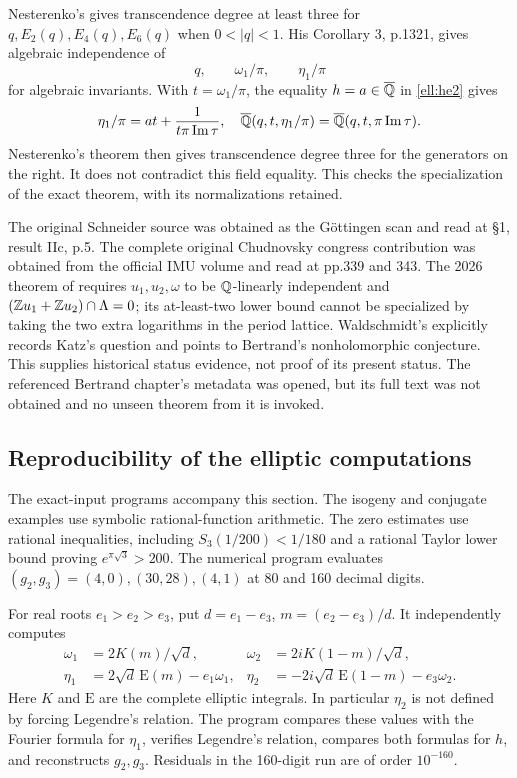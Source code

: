 Nesterenko's \cite[Theorem 1, p.1320]{EllNesterenko1996} gives transcendence degree at least three for $q,E_2(q),E_4(q),E_6(q)$ when $0<|q|<1$. His Corollary 3, p.1321, gives algebraic independence of
\[
 q,\qquad \omega_1/\pi,\qquad \eta_1/\pi
\]
for algebraic invariants. With $t=\omega_1/\pi$, the equality $h=a\in\overline{\mathbb Q}$ in \eqref{ell:he2} gives
\[
 \eta_1/\pi=at+\frac1{t\pi\operatorname{Im}\tau},
 \quad
 \overline{\mathbb Q}(q,t,\eta_1/\pi)=\overline{\mathbb Q}(q,t,\pi\operatorname{Im}\tau).
\]
Nesterenko's theorem then gives transcendence degree three for the generators on the right. It does not contradict this field equality. This checks the specialization of the exact theorem, with its normalizations retained.

The original Schneider source was obtained as the G\"ottingen scan and read at \S1, result IIc, p.5. The complete original Chudnovsky congress contribution was obtained from the official IMU volume and read at pp.339 and 343. The 2026 theorem of \cite[Theorem 1]{EllSenthilKumar2026} requires $u_1,u_2,\omega$ to be $\mathbb Q$-linearly independent and $(\mathbb Z u_1+\mathbb Z u_2)\cap\Lambda=0$; its at-least-two lower bound cannot be specialized by taking the two extra logarithms in the period lattice. Waldschmidt's \cite[\S3.3, p.31]{EllWaldschmidt2004} explicitly records Katz's question and points to Bertrand's nonholomorphic conjecture. This supplies historical status evidence, not proof of its present status. The referenced Bertrand chapter's metadata was opened, but its full text was not obtained and no unseen theorem from it is invoked.

\subsection{Reproducibility of the elliptic computations}

The exact-input programs accompany this section. The isogeny and conjugate examples use symbolic rational-function arithmetic. The zero estimates use rational inequalities, including $S_3(1/200)<1/180$ and a rational Taylor lower bound proving $e^{\pi\sqrt3}>200$. The numerical program evaluates $(g_2,g_3)=(4,0),(30,28),(4,1)$ at 80 and 160 decimal digits.

For real roots $e_1>e_2>e_3$, put $d=e_1-e_3$, $m=(e_2-e_3)/d$. It independently computes
\begin{align*}
 \omega_1&=2K(m)/\sqrt d,&
 \omega_2&=2iK(1-m)/\sqrt d,\\
 \eta_1&=2\sqrt d\,\mathrm E(m)-e_1\omega_1,&
 \eta_2&=-2i\sqrt d\,\mathrm E(1-m)-e_3\omega_2.
\end{align*}
Here $K$ and $\mathrm E$ are the complete elliptic integrals. In particular $\eta_2$ is not defined by forcing Legendre's relation. The program compares these values with the Fourier formula for $\eta_1$, verifies Legendre's relation, compares both formulas for $h$, and reconstructs $g_2,g_3$. Residuals in the 160-digit run are of order $10^{-160}$.

